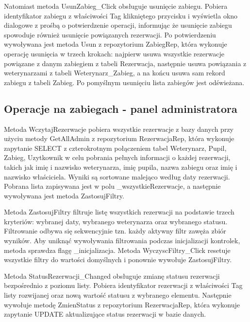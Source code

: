 Natomiast metoda UsunZabieg\_Click obsługuje usunięcie zabiegu. Pobiera identyfikator zabiegu z właściwości Tag
klikniętego przycisku i wyświetla okno dialogowe z prośbą o potwierdzenie operacji, informując że usunięcie zabiegu spowoduje również usunięcie 
powiązanych rezerwacji. Po potwierdzeniu wywoływana jest metoda Usun z repozytorium ZabiegRep, która wykonuje operację usunięcia 
w trzech krokach: najpierw usuwa wszystkie rezerwacje powiązane z danym zabiegiem z tabeli Rezerwacja, następnie usuwa powiązania z 
weterynarzami z tabeli Weterynarz\_Zabieg, a na końcu usuwa sam rekord zabiegu z tabeli Zabieg. 
Po pomyślnym usunięciu lista zabiegów jest odświeżana.



\subsection{Operacje na zabiegach - panel administratora}

Metoda WczytajRezerwacje pobiera wszystkie rezerwacje z bazy danych przy użyciu metody GetAllAdmin z repozytorium RezerwacjaRep, 
która wykonuje zapytanie SELECT z czterokrotnym połączeniem tabel Weterynarz, Pupil, Zabieg, Uzytkownik w 
celu pobrania pełnych informacji o każdej rezerwacji, takich jak imię i nazwisko weterynarza, imię pupila, nazwa zabiegu oraz imię i nazwisko właściciela.
Wyniki są sortowane malejąco według daty rezerwacji. Pobrana lista zapisywana jest w polu \_wszystkieRezerwacje, a 
następnie wywoływana jest metoda ZastosujFiltry.

Metoda ZastosujFiltry filtruje listę wszystkich rezerwacji na podstawie trzech kryteriów: wybranej daty, wybranego weterynarza oraz wybranego statusu. 
Filtrowanie odbywa się sekwencyjnie tzn. każdy aktywny filtr zawęża zbiór wyników. Aby uniknąć wywoływania filtrowania podczas inicjalizacji kontrolek, metoda 
sprawdza flagę \_inicjalizacja. Metoda WyczyscFiltry\_Click resetuje wszystkie filtry do wartości domyślnych i ponownie wywołuje ZastosujFiltry.

Metoda StatusRezerwacji\_Changed obsługuje zmianę statusu rezerwacji bezpośrednio z poziomu listy. 
Pobiera identyfikator rezerwacji z właściwości Tag listy rozwijanej oraz nową wartość statusu z wybranego elementu. 
Następnie wywołuje metodę ZmienStatus z repozytorium RezerwacjaRep, która wykonuje zapytanie UPDATE
aktualizujące status rezerwacji w bazie danych.

